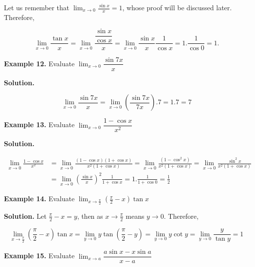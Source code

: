 \documentclass[../../main.tex]{subfiles}
\begin{document}
Let us remember that $\lim_{x \to 0}\frac{\sin x}{x} = 1$, whose proof will be discussed later. Therefore,

\begin{equation*}
    \lim_{x \to 0}\frac{\tan x}{x} = \lim_{x \rightarrow 0}\frac{\dfrac{\sin x}{\cos x}}{x} = \lim_{x \to 0}\frac{\sin x}{x}\frac{1}{\cos x} = 1.\frac{1}{\cos 0}= 1.
\end{equation*}

\vspace{0.2cm}
\textbf{Example 12.}
\vspace{0.2cm}
Evaluate $\lim_{x \rightarrow 0}\dfrac{\sin 7x}{x}$

\textbf{Solution.}

\begin{equation*}
    \lim_{x \to 0}\frac{\sin 7x}{x} = \lim_{x \rightarrow 0}(\frac{\sin 7x}{7x}).7 = 1.7 = 7
\end{equation*}

\vspace{0.2cm}
\textbf{Example 13.}
\vspace{0.2cm}
Evaluate $\lim_{x \rightarrow 0}\dfrac{1-\cos x}{x^2}$

\textbf{Solution.}
    
\begin{align*}
    \lim_{x\to0} \frac{1-\cos x}{x^2} &= \lim_{x\to0} \frac{(1-\cos x)(1+\cos x)}{x^2(1+\cos x)} = \lim_{x\to0} \frac{(1-\cos^2 x)}{x^2(1+\cos x)} = \lim_{x\to0} \frac{\sin^2 x}{x^2(1+\cos x)} \\ 
    &= \lim_{x\to0} \left(\frac{\sin x}{x}\right)^2\frac{1}{1+\cos x} = 1.\frac{1}{1+\cos 0} = \frac{1}{2}
\end{align*}

\vspace{0.2cm}
\textbf{Example 14.}
\vspace{0.2cm}
Evaluate $\lim_{x \rightarrow \frac{\pi}{2}} (\frac{\pi}{2}-x)\tan x$

\textbf{Solution.} Let $\frac{\pi}{2}-x = y$, then as $x\rightarrow\frac{\pi}{2}$ means $y\to0$. Therefore,

\begin{equation*}
    \lim_{x \rightarrow \frac{\pi}{2}} (\frac{\pi}{2}-x)\tan x = \lim_{y\to0} y\tan (\frac{\pi}{2}-y) = \lim_{y\to0} y\cot y = \lim_{y\to0}\frac{y}{\tan y} = 1
\end{equation*}

\vspace{0.2cm}
\textbf{Example 15.}
\vspace{0.2cm}
Evaluate $\lim_{x\rightarrow a}\dfrac{a\sin x-x\sin a}{x-a}$
\end{document}
